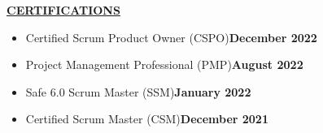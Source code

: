 \documentclass{article}
\begin{document}
\vspace{2mm}
\noindent \textbf{\underline{CERTIFICATIONS}} 
\begin{itemize}[noitemsep,nolistsep,leftmargin=*]
\item {\small Certified Scrum Product Owner (CSPO)}\hfill \textbf{December 2022}
\item {\small Project Management Professional (PMP)}\hfill \textbf{August 2022}
\item {\small Safe 6.0 Scrum Master (SSM)}\hfill \textbf{January 2022}
\item {\small Certified Scrum Master (CSM)}\hfill \textbf{December 2021}
\end{itemize}

\end{document}
